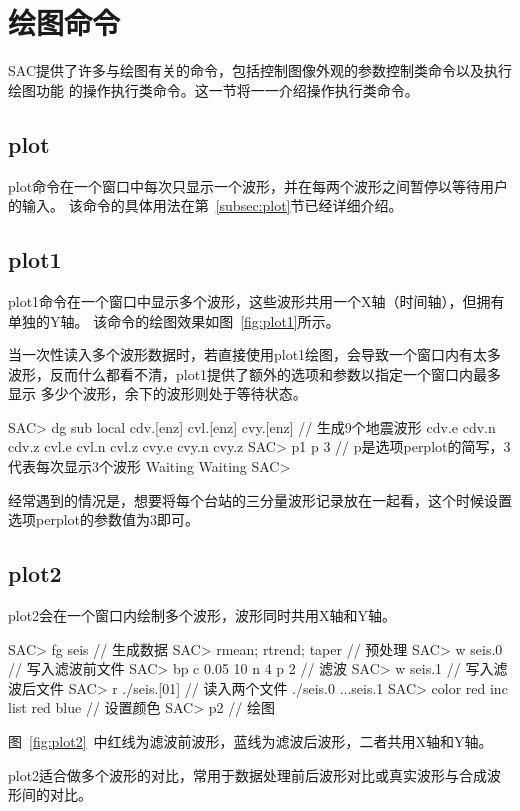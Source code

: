 \section{绘图命令}
SAC提供了许多与绘图有关的命令，包括控制图像外观的参数控制类命令以及执行绘图功能
的操作执行类命令。这一节将一一介绍操作执行类命令。

\subsection{plot}
plot命令在一个窗口中每次只显示一个波形，并在每两个波形之间暂停以等待用户的输入。
该命令的具体用法在第~\ref{subsec:plot}节已经详细介绍。

\subsection{plot1}
plot1命令在一个窗口中显示多个波形，这些波形共用一个X轴（时间轴），但拥有单独的Y轴。
该命令的绘图效果如图~\ref{fig:plot1}所示。

当一次性读入多个波形数据时，若直接使用plot1绘图，会导致一个窗口内有太多
波形，反而什么都看不清，plot1提供了额外的选项和参数以指定一个窗口内最多显示
多少个波形，余下的波形则处于等待状态。
\begin{SACCode}
SAC> dg sub local cdv.[enz] cvl.[enz] cvy.[enz]  // 生成9个地震波形
cdv.e cdv.n cdv.z cvl.e cvl.n cvl.z cvy.e cvy.n cvy.z
SAC> p1 p 3         // p是选项perplot的简写，3代表每次显示3个波形
Waiting
Waiting
SAC> 
\end{SACCode}
经常遇到的情况是，想要将每个台站的三分量波形记录放在一起看，这个时候设置选项perplot的参数值为3即可。

\subsection{plot2}
plot2会在一个窗口内绘制多个波形，波形同时共用X轴和Y轴。

\begin{SACCode}
SAC> fg seis                     // 生成数据
SAC> rmean; rtrend; taper        // 预处理
SAC> w seis.0                    // 写入滤波前文件
SAC> bp c 0.05 10 n 4 p 2        // 滤波
SAC> w seis.1                    // 写入滤波后文件
SAC> r ./seis.[01]               // 读入两个文件
./seis.0 ...seis.1
SAC> color red inc list red blue // 设置颜色
SAC> p2                          // 绘图
\end{SACCode}
图~\ref{fig:plot2}~中红线为滤波前波形，蓝线为滤波后波形，二者共用X轴和Y轴。

plot2适合做多个波形的对比，常用于数据处理前后波形对比或真实波形与合成波形间的对比。

